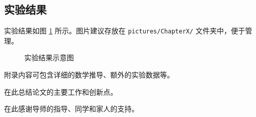 \documentclass{nefuthesis}
\begin{document}
\begin{thesis}
\subsection{实验结果}

实验结果如图 \ref{fig:example} 所示。图片建议存放在
\verb|pictures/ChapterX/| 文件夹中，便于管理。

\begin{figure}[H]
    \centering
    \caption{实验结果示意图}
    \label{fig:example}
\end{figure}

% 
% 

\end{thesis}

\begin{Appendix}
附录内容可包含详细的数学推导、额外的实验数据等。
% 
\end{Appendix}

\begin{conclusion}
在此总结论文的主要工作和创新点。
% 
\end{conclusion}


\begin{published}
\end{published}

\begin{acknowledgement}
在此感谢导师的指导、同学和家人的支持。
% 
\end{acknowledgement}

\declaration
\end{document}
